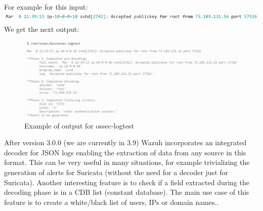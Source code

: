 \linej
\linej
For example for this input:
\linej
\includegraphics[width=\textwidth]{figuras/ossec-logtest_input.png}
\linej
We get the next output:
\begin{figure}[H]
  \centering
	\includegraphics[width=\textwidth]{figuras/ossec-logtest_output.png}
	\caption{Example of output for ossec-logtest}
\end{figure}
\linej
After version 3.0.0 (we are currently in 3.9) Wazuh incorporates an integrated decoder for JSON logs enabling the extraction of data from any source in this format. This can be very useful in many situations, for example trivializing the generation of alerts for Suricata (without the need for a decoder just for Suricata)\cite{wazuh_json}.
\linej
\linej
Another interesting feature is to check if a field extracted during the decoding phase is in a CDB list (constant database). The main use case of this feature is to create a white/black list of users, IPs or domain names.\cite{wazuh_cdb}.
